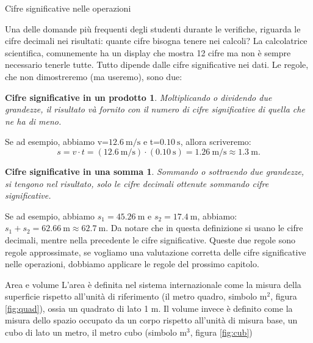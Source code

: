 \documentclass[12pt,a4paper,oneside]{book}
\makeatletter
\newtheorem{csp}{Cifre significative in un prodotto}
\newtheorem{css}{Cifre significative in una somma}
\renewcommand{\section}{\@startsection{section}{1}{\z@}
{-4ex \@plus -1ex \@minus -.4ex}
{1ex \@plus.2ex }
{\normalfont\large\sffamily\bfseries}}
\renewcommand{\subsection}{\@startsection {subsection}{2}{\z@}
{-3ex \@plus -0.1ex \@minus -.4ex}
{0.5ex \@plus.2ex }
{\color[rgb]{0.141,0.596,0.749}\normalfont\sffamily\bfseries}}
\theoremstyle{esercizio}
\makeatother
\begin{document}
\subsection{Cifre significative nelle operazioni}

Una delle domande più frequenti degli studenti durante le verifiche, riguarda le cifre decimali nei risultati: quante cifre bisogna tenere nei calcoli? La calcolatrice scientifica, comunemente ha un display che mostra 12 cifre ma non è sempre necessario tenerle tutte. Tutto dipende dalle cifre significative nei dati. Le regole, che non dimostreremo (ma useremo), sono due:
\begin{csp}
Moltiplicando o dividendo due grandezze, il risultato và fornito con il numero di cifre significative di quella che ne ha di meno.
\end{csp}
Se ad esempio, abbiamo v=$\SI{12,6}{\meter\per\second}$ e t=$\SI{0,10}{\second}$, allora scriveremo:
\[
s=v\cdot t =  \left(\SI{12,6}{\meter\per\second} \right)\cdot\left( \SI{0,10}{\second}\right) = \SI{1,26}{\meter\per\second} \approx \SI{1,3}{\meter}. 
\]
\begin{css}
Sommando o sottraendo due grandezze, si tengono nel risultato, solo le cifre decimali ottenute sommando cifre significative.
\end{css}
Se ad esempio, abbiamo $s_1=\SI{45,26}{\meter}$ e $s_2=\SI{17,4}{\meter}$, abbiamo: $s_1 +s_2 = \SI{62,66}{\meter} \approx \SI{62,7}{\meter}$. Da notare che in questa definizione si usano le cifre decimali, mentre nella precedente le cifre significative. Queste due regole sono regole approssimate, se vogliamo una valutazione corretta delle cifre significative nelle operazioni, dobbiamo applicare le regole del prossimo capitolo.

\section{Area e volume}
L'area è definita nel sistema internazionale come la misura della superficie rispetto all'unità di riferimento (il metro quadro, simbolo $\si{\square\meter}$, figura  \ref{fig:quad}), ossia un quadrato di lato 1 m. Il volume invece è definito come la misura dello spazio occupato da un corpo rispetto all'unità di misura base, un cubo di lato un metro, il metro cubo (simbolo $\si{\cubic\meter}$, figura \ref{fig:cub})\\
\end{document}
